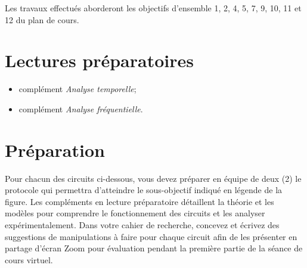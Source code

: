 \documentclass[canadien,12pt,oneside,letterpaper]{article}
\begin{document}
Les travaux effectués aborderont les objectifs d’ensemble 1, 2, 4, 5, 7, 9, 10, 11 et 12 du plan de cours.

\section{Lectures préparatoires}

\begin{itemize}
\item complément \textit{Analyse temporelle};
\item complément \textit{Analyse fréquentielle}.
\end{itemize}





\section{Préparation}

\setlength{\parskip}{1ex plus 0.5ex minus 0.2ex}
Pour chacun des circuits ci-dessous, vous devez préparer en équipe de deux (2) le protocole qui permettra d'atteindre le sous-objectif indiqué en légende de la figure. Les compléments en lecture préparatoire détaillent la théorie et les modèles pour comprendre le fonctionnement des circuits et les analyser expérimentalement. Dans votre cahier de recherche, concevez et écrivez des suggestions de manipulations à faire pour chaque circuit afin de les présenter en partage d'écran Zoom pour évaluation pendant la première partie de la séance de cours virtuel.
\end{document}
